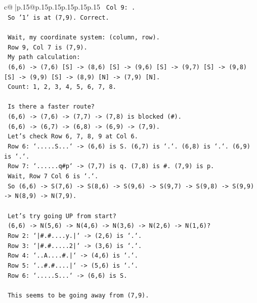 \documentclass{article}
\begin{document}
{\begin{supertabular}{c@{$\;$}|p{.15\linewidth}@{}p{.15\linewidth}p{.15\linewidth}p{.15\linewidth}p{.15\linewidth}p{.15\linewidth}}
{{{\texttt{    Col 9: .} \\
\texttt{    So '1' is at (7,9). Correct.} \\
\\ 
\texttt{    Wait, my coordinate system: (column, row).} \\
\texttt{    Row 9, Col 7 is (7,9).} \\
\texttt{    My path calculation:} \\
\texttt{    (6,6) {-}> (7,6) {[}S{]} {-}> (8,6) {[}S{]} {-}> (9,6) {[}S{]} {-}> (9,7) {[}S{]} {-}> (9,8) {[}S{]} {-}> (9,9) {[}S{]} {-}> (8,9) {[}N{]} {-}> (7,9) {[}N{]}.} \\
\texttt{    Count: 1, 2, 3, 4, 5, 6, 7, 8.} \\
\\ 
\texttt{    Is there a faster route?} \\
\texttt{    (6,6) {-}> (7,6) {-}> (7,7) {-}> (7,8) is blocked (\#).} \\
\texttt{    (6,6) {-}> (6,7) {-}> (6,8) {-}> (6,9) {-}> (7,9).} \\
\texttt{    Let's check Row 6, 7, 8, 9 at Col 6.} \\
\texttt{    Row 6: `.....S...` {-}> (6,6) is S. (6,7) is `.`. (6,8) is `.`. (6,9) is `.`.} \\
\texttt{    Row 7: `......q\#p` {-}> (7,7) is q. (7,8) is \#. (7,9) is p.} \\
\texttt{    Wait, Row 7 Col 6 is `.`.} \\
\texttt{    So (6,6) {-}> S(7,6) {-}> S(8,6) {-}> S(9,6) {-}> S(9,7) {-}> S(9,8) {-}> S(9,9) {-}> N(8,9) {-}> N(7,9).} \\
\\ 
\texttt{    Let's try going UP from start?} \\
\texttt{    (6,6) {-}> N(5,6) {-}> N(4,6) {-}> N(3,6) {-}> N(2,6) {-}> N(1,6)?} \\
\texttt{    Row 2: `|\#.\#....y.|` {-}> (2,6) is `.`.} \\
\texttt{    Row 3: `|\#.\#.....2|` {-}> (3,6) is `.`.} \\
\texttt{    Row 4: `..A....\#.|` {-}> (4,6) is `.`.} \\
\texttt{    Row 5: `..\#.\#....|` {-}> (5,6) is `.`.} \\
\texttt{    Row 6: `.....S...` {-}> (6,6) is S.} \\
\\ 
\texttt{    This seems to be going away from (7,9).} \\
\\ 
}}}
\end{supertabular}}
\end{document}
